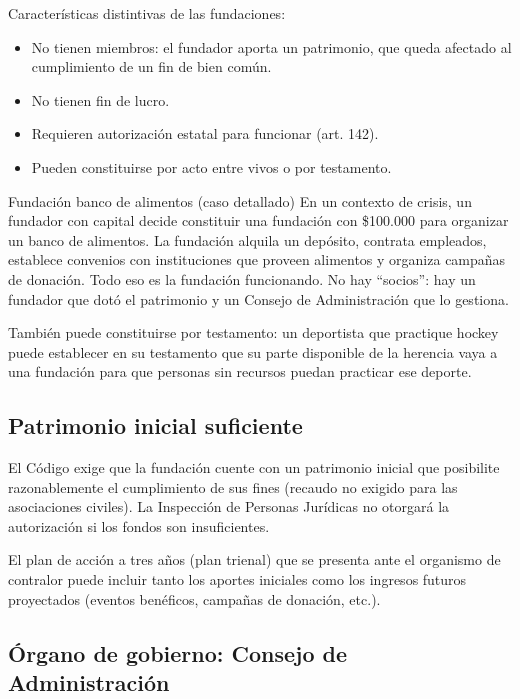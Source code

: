 \documentclass[12pt,oneside]{book}
\begin{document}
Características distintivas de las fundaciones:

\begin{itemize}
    \item No tienen miembros: el fundador aporta un patrimonio, que queda afectado al cumplimiento de un fin de bien común.
    \item No tienen fin de lucro.
    \item Requieren autorización estatal para funcionar (art. 142).
    \item Pueden constituirse por acto entre vivos o por testamento.
\end{itemize}

\begin{example}{Fundación banco de alimentos (caso detallado)}
En un contexto de crisis, un fundador con capital decide constituir una fundación con \$100.000 para organizar un banco de alimentos. La fundación alquila un depósito, contrata empleados, establece convenios con instituciones que proveen alimentos y organiza campañas de donación. Todo eso es la fundación funcionando. No hay ``socios'': hay un fundador que dotó el patrimonio y un Consejo de Administración que lo gestiona.

También puede constituirse por testamento: un deportista que practique hockey puede establecer en su testamento que su parte disponible de la herencia vaya a una fundación para que personas sin recursos puedan practicar ese deporte.
\end{example}

\subsection{Patrimonio inicial suficiente}

El Código exige que la fundación cuente con un patrimonio inicial que posibilite razonablemente el cumplimiento de sus fines (recaudo no exigido para las asociaciones civiles). La Inspección de Personas Jurídicas no otorgará la autorización si los fondos son insuficientes.

El plan de acción a tres años (plan trienal) que se presenta ante el organismo de contralor puede incluir tanto los aportes iniciales como los ingresos futuros proyectados (eventos benéficos, campañas de donación, etc.).

\subsection{Órgano de gobierno: Consejo de Administración}
\end{document}
